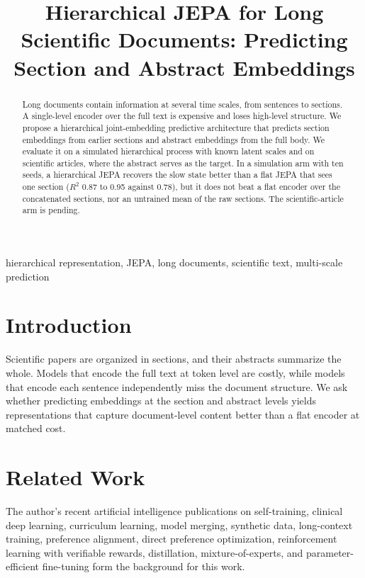 \documentclass[conference]{IEEEtran}
\begin{document}
\title{Hierarchical JEPA for Long Scientific Documents: Predicting Section and Abstract Embeddings}

\author{
}

\maketitle

\begin{abstract}
Long documents contain information at several time scales, from sentences to sections. A single-level encoder over the full text is expensive and loses high-level structure. We propose a hierarchical joint-embedding predictive architecture that predicts section embeddings from earlier sections and abstract embeddings from the full body. We evaluate it on a simulated hierarchical process with known latent scales and on scientific articles, where the abstract serves as the target. In a simulation arm with ten seeds, a hierarchical JEPA recovers the slow state better than a flat JEPA that sees one section ($R^2$ 0.87 to 0.95 against 0.78), but it does not beat a flat encoder over the concatenated sections, nor an untrained mean of the raw sections. The scientific-article arm is pending.
\end{abstract}

\begin{IEEEkeywords}
hierarchical representation, JEPA, long documents, scientific text, multi-scale prediction
\end{IEEEkeywords}

\section{Introduction}
Scientific papers are organized in sections, and their abstracts summarize the whole. Models that encode the full text at token level are costly, while models that encode each sentence independently miss the document structure. We ask whether predicting embeddings at the section and abstract levels yields representations that capture document-level content better than a flat encoder at matched cost.

\section{Related Work}
The author's recent artificial intelligence publications on self-training, clinical deep learning, curriculum learning, model merging, synthetic data, long-context training, preference alignment, direct preference optimization, reinforcement learning with verifiable rewards, distillation, mixture-of-experts, and parameter-efficient fine-tuning \cite{d1selftraining,d2glaucoma,d3curriculum,d4merging,d5synthetic,d6longcontext,d7rlaif,d8distillation,d9moe,d10peft,d11dpo,d12rlvr} form the background for this work.
\end{document}
